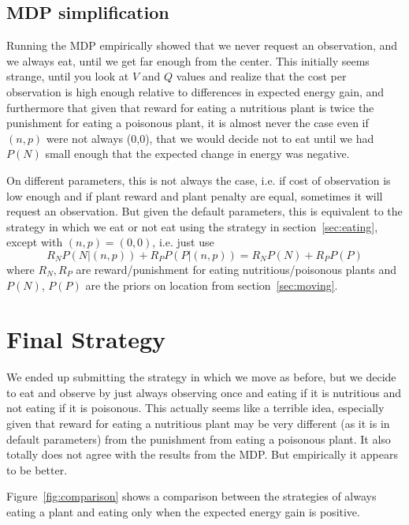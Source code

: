 \documentclass{article}
\begin{document}
\subsection{MDP simplification}
Running the MDP empirically showed that we never request an
observation, and we always eat, until we get far enough from the
center.  This initially seems strange, until you look at $V$ and $Q$
values and realize that the cost per observation is high enough
relative to differences in expected energy gain, and furthermore that
given that reward for eating a nutritious plant is twice the
punishment for eating a poisonous plant, it is almost never the case
even if $(n,p)$ were not always (0,0), that we would decide not to eat
until we had $P(N)$ small enough that the expected change in energy
was negative.

On different parameters, this is not always the case, i.e. if cost of
observation is low enough and if plant reward and plant penalty are
equal, sometimes it will request an observation. But given the default
parameters, this is equivalent to the strategy in which we eat or not
eat using the strategy in section~\ref{sec:eating}, except with
$(n,p)=(0,0)$, i.e.  just use
\[R_NP(N|(n,p))+R_PP(P|(n,p))=R_NP(N)+R_PP(P)\]
where $R_N,R_P$ are reward/punishment for eating nutritious/poisonous
plants and $P(N)$, $P(P)$ are the priors on location from
section~\ref{sec:moving}.


\section{Final Strategy}
We ended up submitting the strategy in which we move as before, but we
decide to eat and observe by just always observing once and eating if
it is nutritious and not eating if it is poisonous. This actually
seems like a terrible idea, especially given that reward for eating a
nutritious plant may be very different (as it is in default
parameters) from the punishment from eating a poisonous plant. It also
totally does not agree with the results from the MDP. But empirically
it appears to be better.

Figure~\ref{fig:comparison} shows a comparison between the strategies
of always eating a plant and eating only when the expected energy gain
is positive.
\end{document}
